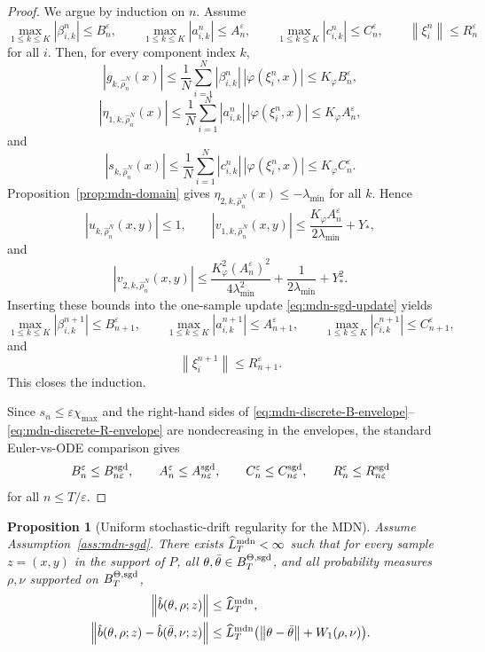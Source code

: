 \documentclass[11pt]{article}
\newtheorem{proposition}[theorem]{Proposition}
\theoremstyle{definition}
\newcommand{\norm}[1]{\left\lVert #1 \right\rVert}
\begin{document}
\begin{proof}
We argue by induction on $n$. Assume
\[
  \max_{1\le k\le K}|\beta_{i,k}^n|\le B_n^\varepsilon,
  \qquad
  \max_{1\le k\le K}|a_{i,k}^n|\le A_n^\varepsilon,
  \qquad
  \max_{1\le k\le K}|c_{i,k}^n|\le C_n^\varepsilon,
  \qquad
  \norm{\xi_i^n}\le R_n^\varepsilon
\]
for all $i$. Then, for every component index $k$,
\[
  |g_{k,\hat\rho_n^N}(x)|
  \le
  \frac1N\sum_{i=1}^N |\beta_{i,k}^n|\,|\varphi(\xi_i^n,x)|
  \le
  K_\varphi B_n^\varepsilon,
\]
\[
  |\eta_{1,k,\hat\rho_n^N}(x)|
  \le
  \frac1N\sum_{i=1}^N |a_{i,k}^n|\,|\varphi(\xi_i^n,x)|
  \le
  K_\varphi A_n^\varepsilon,
\]
and
\[
  |s_{k,\hat\rho_n^N}(x)|
  \le
  \frac1N\sum_{i=1}^N |c_{i,k}^n|\,|\varphi(\xi_i^n,x)|
  \le
  K_\varphi C_n^\varepsilon.
\]
Proposition~\ref{prop:mdn-domain} gives
$\eta_{2,k,\hat\rho_n^N}(x)\le -\lambda_{\min}$ for all $k$. Hence
\[
  |u_{k,\hat\rho_n^N}(x,y)|\le 1,
  \qquad
  |v_{1,k,\hat\rho_n^N}(x,y)|
  \le
  \frac{K_\varphi A_n^\varepsilon}{2\lambda_{\min}}+Y_\ast,
\]
and
\[
  |v_{2,k,\hat\rho_n^N}(x,y)|
  \le
  \frac{K_\varphi^2 (A_n^\varepsilon)^2}{4\lambda_{\min}^2}
  +
  \frac{1}{2\lambda_{\min}}
  +
  Y_\ast^2.
\]
Inserting these bounds into the one-sample update
\eqref{eq:mdn-sgd-update} yields
\[
  \max_{1\le k\le K}|\beta_{i,k}^{n+1}|
  \le
  B_{n+1}^\varepsilon,
  \qquad
  \max_{1\le k\le K}|a_{i,k}^{n+1}|
  \le
  A_{n+1}^\varepsilon,
  \qquad
  \max_{1\le k\le K}|c_{i,k}^{n+1}|
  \le
  C_{n+1}^\varepsilon,
\]
and
\[
  \norm{\xi_i^{n+1}}
  \le
  R_{n+1}^\varepsilon.
\]
This closes the induction.

Since $s_n\le \varepsilon\chi_{\max}$ and the right-hand sides of
\eqref{eq:mdn-discrete-B-envelope}--\eqref{eq:mdn-discrete-R-envelope} are
nondecreasing in the envelopes, the standard Euler-vs-ODE comparison gives
\[
  B_n^\varepsilon\le B_{n\varepsilon}^{\rm sgd},
  \qquad
  A_n^\varepsilon\le A_{n\varepsilon}^{\rm sgd},
  \qquad
  C_n^\varepsilon\le C_{n\varepsilon}^{\rm sgd},
  \qquad
  R_n^\varepsilon\le R_{n\varepsilon}^{\rm sgd}
\]
for all $n\le T/\varepsilon$.
\end{proof}

\begin{proposition}[Uniform stochastic-drift regularity for the MDN]
\label{prop:mdn-sample-drift-regularity}
Assume Assumption~\ref{ass:mdn-sgd}. There exists
$\widehat L_T^{\rm mdn}<\infty$ such that for every sample $z=(x,y)$ in the
support of $P$, all $\theta,\bar\theta\in B_T^{\Theta,\rm sgd}$, and all
probability measures $\rho,\nu$ supported on $B_T^{\Theta,\rm sgd}$,
\begin{align}
  \norm{\hat b(\theta,\rho;z)}
  &\le
  \widehat L_T^{\rm mdn},
  \label{eq:mdn-sample-drift-bound}
  \\
  \norm{\hat b(\theta,\rho;z)-\hat b(\bar\theta,\nu;z)}
  &\le
  \widehat L_T^{\rm mdn}
  \bigl(\norm{\theta-\bar\theta}+W_1(\rho,\nu)\bigr).
  \label{eq:mdn-sample-drift-lipschitz}
\end{align}
\end{proposition}
\end{document}
